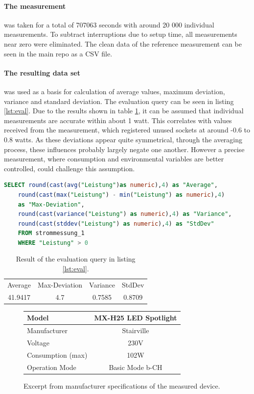 \paragraph{The measurement} was taken for a total of 707063 seconds with around 20 000 individual measurements. To subtract interruptions due to setup time, all measurements near zero were eliminated. The clean data of the reference measurement can be seen in the \gls{main repo} as a CSV file. 
\paragraph{The resulting data set} was used as a basis for calculation of average values, maximum deviation, variance and standard deviation. The evaluation query can be seen in listing \ref{lst:eval}. Due to the results shown in table \ref{tab:result}, it can be assumed that individual measurements are accurate within about 1 watt. This correlates with values received from the measurement, which registered unused sockets at around -0.6 to 0.8 watts. As these deviations appear quite symmetrical, through the averaging process, these influences probably largely negate one another. However a precise measurement, where consumption and environmental variables are better controlled, could challenge this assumption. 

\begin{lstlisting}[language=sql, caption={Evaluation query of the reference measurement.}, label={lst:eval}]
	SELECT round(cast(avg("Leistung")as numeric),4) as "Average",
	round(cast(max("Leistung") - min("Leistung") as numeric),4) 
	as "Max-Deviation",
	round(cast(variance("Leistung") as numeric),4) as "Variance",
	round(cast(stddev("Leistung") as numeric),4) as "StdDev"
	FROM strommessung_1
	WHERE "Leistung" > 0
\end{lstlisting}

\begin{table}[h]
	\centering
	\begin{tabular}{cccc}
		Average &Max-Deviation &Variance &StdDev\\
		41.9417 &4.7 &0.7585 &0.8709
	\end{tabular}
	\caption{Result of the evaluation query in listing \ref{lst:eval}.}
	\label{tab:result}
\end{table}

\begin{figure}
	\centering
	\begin{tabular}{l|c}
		\hline
		Model & MX-H25 LED Spotlight\\ \hline
		Manufacturer & Stairville\\ \hline
		Voltage & 230V\\ \hline
		Consumption (max) & 102W\\ \hline
		Operation Mode & Basic Mode b-CH\\ \hline
		
	\end{tabular}
	\caption{Excerpt from manufacturer specifications of the measured device.}
	\label{tab:movinghead}
\end{figure}
